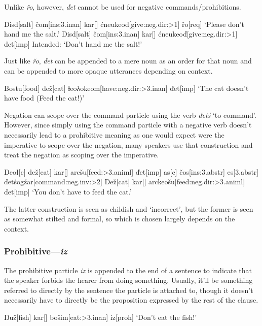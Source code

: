 \documentclass[a4paper,11pt,oneside,openany]{memoir}
\newcommand{\vd}{ď}
\newcommand{\vc}{č}
\newcommand{\vz}{ž}
\newcommand{\vs}{š}
\newcommand{\vr}{ř}
\newcommand{\Engma}{Ŋ}
\newcommand{\dbl}{ⱡ}
\newcommand{\lam}{λ}
\begin{document}
Unlike \textit{\vr o}, however, \textit{\vd et} cannot be used for negative commands/prohibitions.

\pex 
\a 
\begingl
Disd[salt]
\vc om[\sc ins:3.inan]
kar[]
\'cneukeo\vd[give:{\sc neg.dir:>1}]
\vr o[\sc req]
\glft `Please don't hand me the salt.'
\endgl
\a \ljudge{\#}
\begingl
Disd[salt]
\vc om[\sc ins:3.inan]
kar[]
\'cneukeo\vd[give:{\sc neg.dir:>1}]
\vd et[\sc imp]
\glft Intended: `Don't hand me the salt!'
\endgl
\xe

Just like \textit{\vr o}, \textit{\vd et} can be appended to a mere noun as an order for that noun and can be appended to more opaque utterances depending on context. 

\ex 
\begingl
Bostu[food]
de\vz[cat]
\dbl eo\lam okeom[have:{\sc neg.dir:>3.inan}]
\vd et[\sc imp]
\glft `The cat doesn't have food (Feed the cat!)'
\endgl
\xe

Negation can scope over the command particle using the verb \textit{\vd et\'s} `to command'. However, since simply using the command particle with a negative verb doesn't necessarily lead to a prohibitive meaning as one would expect were the imperative to scope over the negation, many speakers use that construction and treat the negation as scoping over the imperative.

\pex
\a 
\begingl
Deo\l[\sc c]
de\vz[cat]
kar[]
arc\vs u[feed:{\sc >3.animl}]
\vd et[\sc imp]
\nogloss{,}
as[\sc c]
\vc os[\sc ins:3.abstr]
es[\sc 3.abstr]
\vd et\'sog\'zar[command:{\sc neg.inv:>2}]
\endgl
\a {}
\begingl
De\vz[cat]
kar[]
arckeo\vs u[feed:{\sc neg.dir:>3.animl}]
\vd et[\sc imp]
\glft `You don't have to feed the cat.'
\endgl
\xe 

The latter construction is seen as childish and `incorrect', but the former is seen as somewhat stilted and formal, so which is chosen largely depends on the context.

\subsubsection{Prohibitive---\textit{iz}}

The prohibitive particle \textit{iz} is appended to the end of a sentence to indicate that the speaker forbids the hearer from doing something. Usually, it'll be something referred to directly by the sentence the particle is attached to, though it doesn't necessarily have to directly be the proposition expressed by the rest of the clause.

\ex 
\begingl
\Engma u\vz[fish]
kar[]
bo\vs im[eat:{\sc >3.inan}]
iz[\sc proh]
\glft `Don't eat the fish!'
\endgl
\xe 
\end{document}
